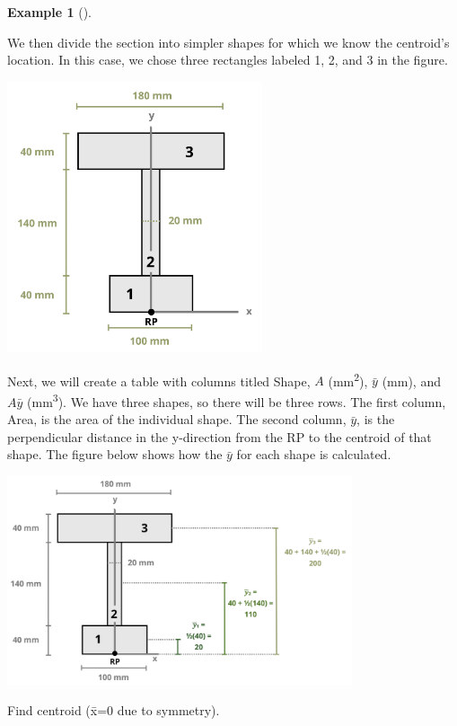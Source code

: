 \documentclass[
  letterpaper,
  DIV=11,
  numbers=noendperiod]{scrreprt}
\theoremstyle{definition}
\newtheorem{example}{Example}[chapter]
\theoremstyle{remark}
\begin{document}
\begin{tcolorbox}
\begin{example}[]
\begin{tcolorbox}
We then divide the section into simpler shapes for which we know the
centroid's location. In this case, we chose three rectangles labeled 1,
2, and 3 in the figure.

\begin{center}
\includegraphics[width=2.95833in,height=\textheight]{images/CH 8 PNGs/example 8.2 part 2.png}
\end{center}

Next, we will create a table with columns titled Shape, \(A\)
(mm\textsuperscript{2}), \(\bar{y}\) (mm), and \(A\bar{y}\)
(mm\textsuperscript{3}). We have three shapes, so there will be three
rows. The first column, Area, is the area of the individual shape. The
second column, \(\bar{y}\), is the perpendicular distance in the
y-direction from the RP to the centroid of that shape. The figure below
shows how the \(\bar{y}\) for each shape is calculated.

\begin{center}
\includegraphics[width=4in,height=\textheight]{images/CH 8 PNGs/example 8.2 part 3.png}
\end{center}

Find centroid (x̄=0 due to symmetry).


\end{tcolorbox}
\end{example}
\end{tcolorbox}
\end{document}
